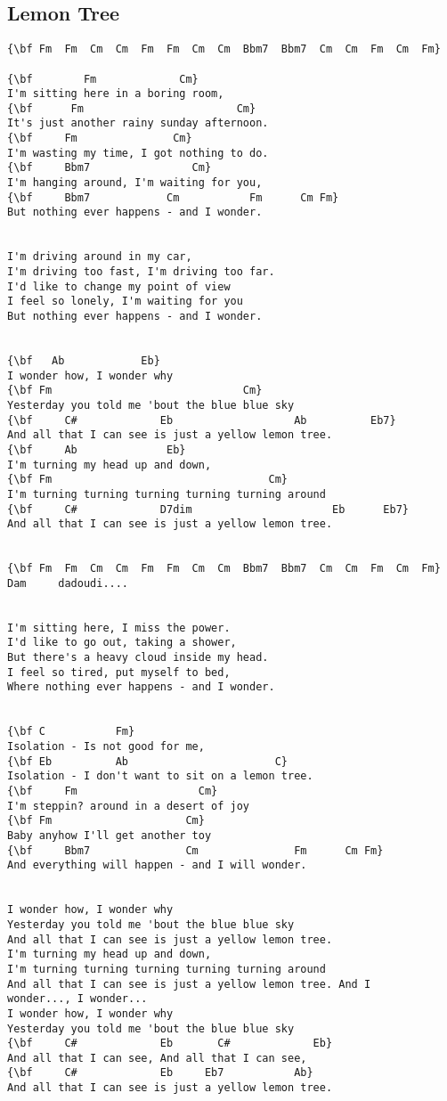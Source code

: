 \documentclass[a4paper]{article}
\begin{document}
\subsection{Lemon Tree} %
\label{sub:Lemon Tree}
\begin{Verbatim}[commandchars=\\\{\}]
{\bf Fm  Fm  Cm  Cm  Fm  Fm  Cm  Cm  Bbm7  Bbm7  Cm  Cm  Fm  Cm  Fm}

{\bf        Fm             Cm}
I'm sitting here in a boring room,
{\bf      Fm                        Cm}
It's just another rainy sunday afternoon.
{\bf     Fm               Cm}
I'm wasting my time, I got nothing to do.
{\bf     Bbm7                Cm}
I'm hanging around, I'm waiting for you,
{\bf     Bbm7            Cm           Fm      Cm Fm}
But nothing ever happens - and I wonder.


I'm driving around in my car,
I'm driving too fast, I'm driving too far.
I'd like to change my point of view
I feel so lonely, I'm waiting for you
But nothing ever happens - and I wonder.


{\bf   Ab            Eb}
I wonder how, I wonder why
{\bf Fm                              Cm}
Yesterday you told me 'bout the blue blue sky
{\bf     C#             Eb                   Ab          Eb7}
And all that I can see is just a yellow lemon tree.
{\bf     Ab              Eb}
I'm turning my head up and down,
{\bf Fm                                  Cm}
I'm turning turning turning turning turning around
{\bf     C#             D7dim                      Eb      Eb7}
And all that I can see is just a yellow lemon tree.


{\bf Fm  Fm  Cm  Cm  Fm  Fm  Cm  Cm  Bbm7  Bbm7  Cm  Cm  Fm  Cm  Fm}
Dam     dadoudi....


I'm sitting here, I miss the power.
I'd like to go out, taking a shower,
But there's a heavy cloud inside my head.
I feel so tired, put myself to bed,
Where nothing ever happens - and I wonder.


{\bf C           Fm}
Isolation - Is not good for me,
{\bf Eb          Ab                       C}
Isolation - I don't want to sit on a lemon tree.
{\bf     Fm                   Cm}
I'm steppin? around in a desert of joy
{\bf Fm                     Cm}
Baby anyhow I'll get another toy
{\bf     Bbm7               Cm               Fm      Cm Fm}
And everything will happen - and I will wonder.


I wonder how, I wonder why
Yesterday you told me 'bout the blue blue sky
And all that I can see is just a yellow lemon tree.
I'm turning my head up and down,
I'm turning turning turning turning turning around
And all that I can see is just a yellow lemon tree. And I
wonder..., I wonder...
I wonder how, I wonder why
Yesterday you told me 'bout the blue blue sky
{\bf     C#             Eb       C#             Eb}
And all that I can see, And all that I can see,
{\bf     C#             Eb     Eb7           Ab}
And all that I can see is just a yellow lemon tree.
\end{Verbatim}
\newpage
\end{document}
